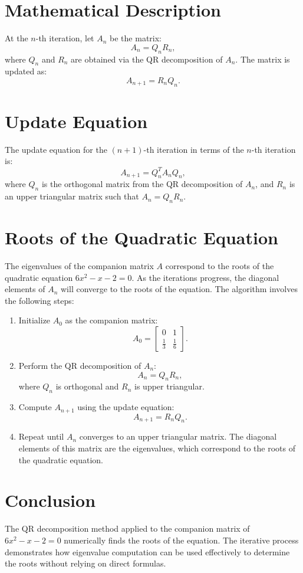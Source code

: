 \documentclass[journal]{IEEEtran}
\begin{document}
\section*{Mathematical Description}
At the \(n\)-th iteration, let \( A_n \) be the matrix:
\[
A_n = Q_n R_n,
\]
where \( Q_n \) and \( R_n \) are obtained via the QR decomposition of \( A_n \). The matrix is updated as:
\[
A_{n+1} = R_n Q_n.
\]

\section*{Update Equation}
The update equation for the \((n+1)\)-th iteration in terms of the \(n\)-th iteration is:
\[
A_{n+1} = Q_n^T A_n Q_n,
\]
where \( Q_n \) is the orthogonal matrix from the QR decomposition of \( A_n \), and \( R_n \) is an upper triangular matrix such that \( A_n = Q_n R_n \).

\section*{Roots of the Quadratic Equation}
The eigenvalues of the companion matrix \( A \) correspond to the roots of the quadratic equation \( 6x^2 - x - 2 = 0 \). As the iterations progress, the diagonal elements of \( A_n \) will converge to the roots of the equation. The algorithm involves the following steps:
\begin{enumerate}
    \item Initialize \( A_0 \) as the companion matrix:
    \[
    A_0 = \begin{bmatrix}
    0 & 1 \\
    \frac{1}{3} & \frac{1}{6}
    \end{bmatrix}.
    \]
    \item Perform the QR decomposition of \( A_n \):
    \[
    A_n = Q_n R_n,
    \]
    where \( Q_n \) is orthogonal and \( R_n \) is upper triangular.
    \item Compute \( A_{n+1} \) using the update equation:
    \[
    A_{n+1} = R_n Q_n.
    \]
    \item Repeat until \( A_n \) converges to an upper triangular matrix. The diagonal elements of this matrix are the eigenvalues, which correspond to the roots of the quadratic equation.
\end{enumerate}

\section*{Conclusion}
The QR decomposition method applied to the companion matrix of \( 6x^2 - x - 2 = 0 \) numerically finds the roots of the equation. The iterative process demonstrates how eigenvalue computation can be used effectively to determine the roots without relying on direct formulas.
\end{document}
